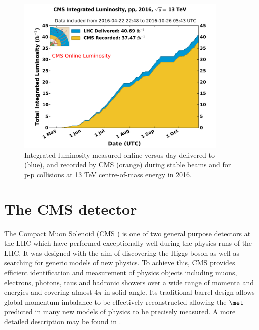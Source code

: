\begin{figure}
\centering
    \includegraphics[width=0.9\textwidth]{./Figures/detector/int_lumi_per_day_cumulative_pp_2016OnlineLumi}
  \caption{Integrated luminosity measured online versus day delivered to (blue), 
  and recorded by CMS (orange) during stable beams and for p-p collisions at 13 TeV centre-of-mass energy in 2016.}
  \label{fig:LHC-integrated-lumi}
\end{figure}

\section{The CMS detector}
The Compact Muon Solenoid (CMS \cite{CMS}) is one of two general purpose detectors at the LHC 
which have performed exceptionally well during the physics runs of the LHC. It was designed
with the aim of discovering the Higgs boson as well as searching for generic models 
of new physics. To achieve this, CMS provides efficient identification and measurement
of physics objects including muons, electrons, photons, taus and hadronic showers over a
wide range of momenta and energies and covering almost $4\pi$ in solid angle. 
Its traditional barrel design allows global momentum imbalance to be effectively 
reconstructed allowing the $\met$ predicted in many new models of physics to be
precisely measured. A more detailed description may be found in \cite{CMS}. 

